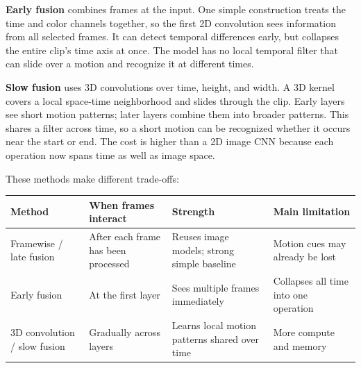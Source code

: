 \textbf{Early fusion} combines frames at the input. One simple construction treats the time and color channels together, so the first 2D convolution sees information from all selected frames. It can detect temporal differences early, but collapses the entire clip's time axis at once. The model has no local temporal filter that can slide over a motion and recognize it at different times.

\textbf{Slow fusion} uses 3D convolutions over time, height, and width. A 3D kernel covers a local space-time neighborhood and slides through the clip. Early layers see short motion patterns; later layers combine them into broader patterns. This shares a filter across time, so a short motion can be recognized whether it occurs near the start or end. The cost is higher than a 2D image CNN because each operation now spans time as well as image space.

These methods make different trade-offs:

{\def\LTcaptype{none} %
\begin{longtable}[]{@{}
  >{\raggedright\arraybackslash}p{}
  >{\raggedright\arraybackslash}p{}
  >{\raggedright\arraybackslash}p{}
  >{\raggedright\arraybackslash}p{}@{}}
\toprule\noalign{}
\begin{minipage}[b]{\linewidth}\raggedright
Method
\end{minipage} & \begin{minipage}[b]{\linewidth}\raggedright
When frames interact
\end{minipage} & \begin{minipage}[b]{\linewidth}\raggedright
Strength
\end{minipage} & \begin{minipage}[b]{\linewidth}\raggedright
Main limitation
\end{minipage} \\
\midrule\noalign{}
\endhead
\bottomrule\noalign{}
\endlastfoot
Framewise / late fusion & After each frame has been processed & Reuses image models; strong simple baseline & Motion cues may already be lost \\
Early fusion & At the first layer & Sees multiple frames immediately & Collapses all time into one operation \\
3D convolution / slow fusion & Gradually across layers & Learns local motion patterns shared over time & More compute and memory \\
\end{longtable}
}

